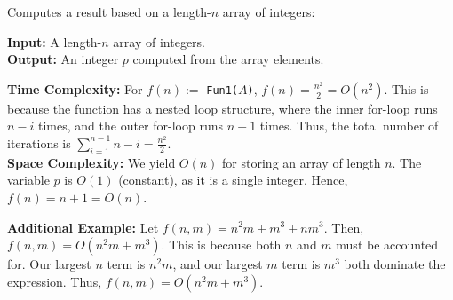 \begin{Func}
    Computes a result based on a length-$n$ array of integers:

    \vspace{.5em}
    \noindent
    \textbf{Input: } A length-$n$ array of integers.\\
    \textbf{Output: } An integer $p$ computed from the array elements.\\
    \begin{algorithm}[H]
        \SetAlgoLined
        
        \vspace{.5em}
    \end{algorithm}

    \noindent
    \textbf{Time Complexity:} For $f(n):=$ \texttt{Fun1($A$)}, $f(n)=\frac{n^2}{2}=O(n^2)$. This is because the function has a nested loop structure, where the inner for-loop runs $n-i$ times, and the outer for-loop runs $n-1$ times. Thus, the total number of iterations is $\sum_{i=1}^{n-1}n-i=\frac{n^2}{2}$.\\

    \noindent
    \textbf{Space Complexity:} We yield $O(n)$ for storing an array of length $n$. The variable $p$ is $O(1)$ (constant), as it is a single integer. Hence, $f(n)=n+1=O(n)$.
    \end{Func}   

    \noindent
    \textbf{Additional Example:} Let $f(n,m) = n^2m + m^3 + nm^3$. Then, $f(n,m)=O(n^2m+m^3)$. This is because both $n$ and $m$ must be accounted for. Our largest $n$ term is $n^2m$, and our largest $m$ term is $m^3$ both dominate the expression. Thus, $f(n,m)=O(n^2m+m^3)$.



